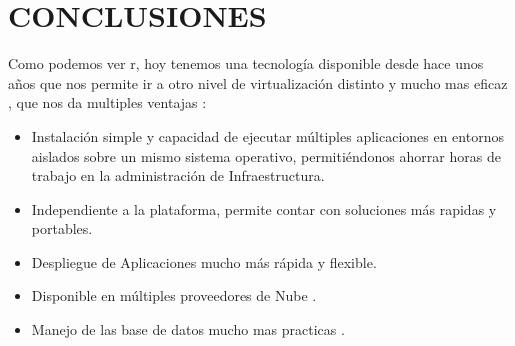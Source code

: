 \section{CONCLUSIONES}
Como podemos ver r, hoy tenemos una tecnología disponible desde hace unos años que nos permite ir a otro nivel de virtualización distinto y mucho mas eficaz  , que nos da multiples ventajas :
\begin{itemize}
\item Instalación simple y capacidad de ejecutar múltiples aplicaciones en entornos aislados sobre un mismo sistema operativo,  permitiéndonos ahorrar horas de trabajo en la administración de Infraestructura.
\item Independiente a la plataforma, permite contar con soluciones más  rapidas y portables.
\item Despliegue de Aplicaciones mucho más rápida y flexible.
\item Disponible en múltiples proveedores de Nube .
\item Manejo de las base de datos mucho mas practicas .
	
\end{itemize}

\newpage
